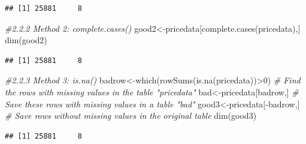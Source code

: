 \documentclass[
  landscape]{article}
\newenvironment{Shaded}{\begin{snugshade}}{\end{snugshade}}
\newcommand{\AttributeTok}[1]{\textcolor[rgb]{0.77,0.63,0.00}{#1}}
\newcommand{\CommentTok}[1]{\textcolor[rgb]{0.56,0.35,0.01}{\textit{#1}}}
\newcommand{\ConstantTok}[1]{\textcolor[rgb]{0.00,0.00,0.00}{#1}}
\newcommand{\DecValTok}[1]{\textcolor[rgb]{0.00,0.00,0.81}{#1}}
\newcommand{\FunctionTok}[1]{\textcolor[rgb]{0.00,0.00,0.00}{#1}}
\newcommand{\NormalTok}[1]{#1}
\newcommand{\OtherTok}[1]{\textcolor[rgb]{0.56,0.35,0.01}{#1}}
\newcommand{\SpecialCharTok}[1]{\textcolor[rgb]{0.00,0.00,0.00}{#1}}
\newcommand{\StringTok}[1]{\textcolor[rgb]{0.31,0.60,0.02}{#1}}
\begin{document}
\begin{verbatim}
## [1] 25881     8
\end{verbatim}

\begin{Shaded}
\begin{Highlighting}[]
\CommentTok{\#2.2.2 Method 2: complete.cases()}
\NormalTok{good2}\OtherTok{\textless{}{-}}\NormalTok{pricedata[}\FunctionTok{complete.cases}\NormalTok{(pricedata),] }
\FunctionTok{dim}\NormalTok{(good2)}
\end{Highlighting}
\end{Shaded}

\begin{verbatim}
## [1] 25881     8
\end{verbatim}

\begin{Shaded}
\begin{Highlighting}[]
\CommentTok{\#2.2.3 Method 3: is.na()}
\NormalTok{badrow}\OtherTok{\textless{}{-}}\FunctionTok{which}\NormalTok{(}\FunctionTok{rowSums}\NormalTok{(}\FunctionTok{is.na}\NormalTok{(pricedata))}\SpecialCharTok{\textgreater{}}\DecValTok{0}\NormalTok{) }\CommentTok{\# Find the rows with missing values in the table "pricedata"}
\NormalTok{bad}\OtherTok{\textless{}{-}}\NormalTok{pricedata[badrow,] }\CommentTok{\# Save these rows with missing values in a table "bad"}
\NormalTok{good3}\OtherTok{\textless{}{-}}\NormalTok{pricedata[}\SpecialCharTok{{-}}\NormalTok{badrow,] }\CommentTok{\# Save rows without missing values in the original table}
\FunctionTok{dim}\NormalTok{(good3)}
\end{Highlighting}
\end{Shaded}

\begin{verbatim}
## [1] 25881     8
\end{verbatim}

\begin{Shaded}
\end{Shaded}
\end{document}
